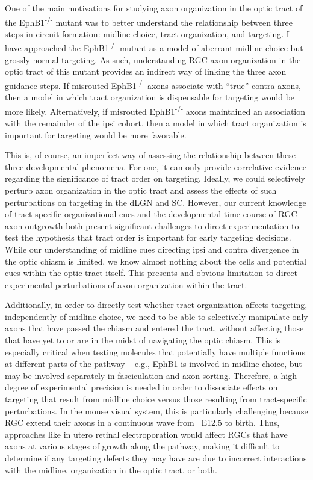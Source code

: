 \label{sec:LinkingEphB1}
One of the main motivations for studying axon organization in the optic tract of the EphB1\textsuperscript{-/-} mutant was to better understand the relationship between three steps in circuit formation: midline choice, tract organization, and targeting.
I have approached the EphB1\textsuperscript{-/-} mutant as a model of aberrant midline choice but grossly normal targeting.
As such, understanding RGC axon organization in the optic tract of this mutant provides an indirect way of linking the three axon guidance steps.
If misrouted EphB1\textsuperscript{-/-} axons associate with ``true'' contra axons, then a model in which tract organization is dispensable for targeting would be more likely.
Alternatively, if misrouted EphB1\textsuperscript{-/-} axons maintained an association with the remainder of the ipsi cohort, then a model in which tract organization is important for targeting would be more favorable.

This is, of course, an imperfect way of assessing the relationship between these three developmental phenomena. 
For one, it can only provide correlative evidence regarding the significance of tract order on targeting.
Ideally, we could selectively perturb axon organization in the optic tract and assess the effects of such perturbations on targeting in the dLGN and SC.
However, our current knowledge of tract-specific organizational cues and the developmental time course of RGC axon outgrowth both present significant challenges to direct experimentation to test the hypothesis that tract order is important for early targeting decisions.
While our understanding of midline cues directing ipsi and contra divergence in the optic chiasm is limited, we know almost nothing about the cells and potential cues within the optic tract itself.
This presents and obvious limitation to direct experimental perturbations of axon organization within the tract.

Additionally, in order to directly test whether tract organization affects targeting, independently of midline choice, we need to be able to selectively manipulate only axons that have passed the chiasm and entered the tract, without affecting those that have yet to or are in the midst of navigating the optic chiasm.
This is especially critical when testing molecules that potentially have multiple functions at different parts of the pathway -- e.g., EphB1 is involved in midline choice, but may be involved separately in fasciculation and axon sorting. 
Therefore, a high degree of experimental precision is needed in order to dissociate effects on targeting that result from midline choice versus those resulting from tract-specific perturbations.
In the mouse visual system, this is particularly challenging because RGC extend their axons in a continuous wave from ~E12.5 to birth.
Thus, approaches like in utero retinal electroporation would affect RGCs that have axons at various stages of growth along the pathway, making it difficult to determine if any targeting defects they may have are due to incorrect interactions with the midline, organization in the optic tract, or both.

